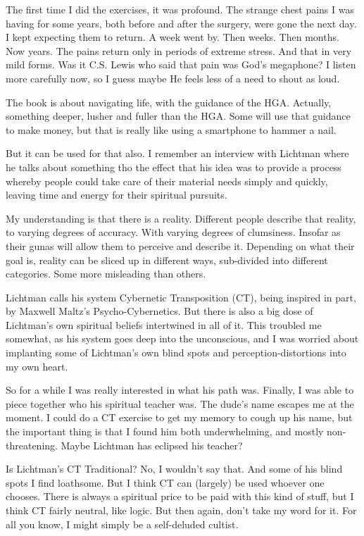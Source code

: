 \begin{footnotesize}
\begin{sffamily}
The first time I did the exercises, it was profound. The strange chest pains I was having for some years, both before and after the surgery, were gone the next day. I kept expecting them to return. A week went by. Then weeks. Then months. Now years. The pains return only in periods of extreme stress. And that in very mild forms. Was it C.S. Lewis who said that pain was God's megaphone? I listen more carefully now, so I guess maybe He feels less of a need to shout as loud. 

The book is about navigating life, with the guidance of the HGA. Actually, something deeper, lusher and fuller than the HGA. Some will use that guidance to make money, but that is really like using a smartphone to hammer a nail.

But it can be used for that also. I remember an interview with Lichtman where he talks about something tho the effect that his idea was to provide a process whereby people could take care of their material needs simply and quickly, leaving time and energy for their spiritual pursuits.

My understanding is that there is a reality. Different people describe that reality, to varying degrees of accuracy. With varying degrees of clumsiness. Insofar as their gunas will allow them to perceive and describe it. Depending on what their goal is, reality can be sliced up in different ways, sub-divided into different categories. Some more misleading than others.

Lichtman calls his system Cybernetic Transposition (CT), being inspired in part, by Maxwell Maltz's Psycho-Cybernetics. But there is also a big dose of Lichtman's own spiritual beliefs intertwined in all of it. This troubled me somewhat, as his system goes deep into the unconscious, and I was worried about implanting some of Lichtman's own blind spots and perception-distortions into my own heart. 

So for a while I was really interested in what his path was. Finally, I was able to piece together who his spiritual teacher was. The dude's name escapes me at the moment. I could do a CT exercise to get my memory to cough up his name, but the important thing is that I found him both underwhelming, and mostly non-threatening. Maybe Lichtman has eclipsed his teacher?

Is Lichtman's CT Traditional? No, I wouldn't say that. And some of his blind spots I find loathsome. But I think CT can (largely) be used whoever one chooses. There is always a spiritual price to be paid with this kind of stuff, but I think CT fairly neutral, like logic. But then again, don't take my word for it. For all you know, I might simply be a self-deluded cultist.


\end{sffamily}
\end{footnotesize}
